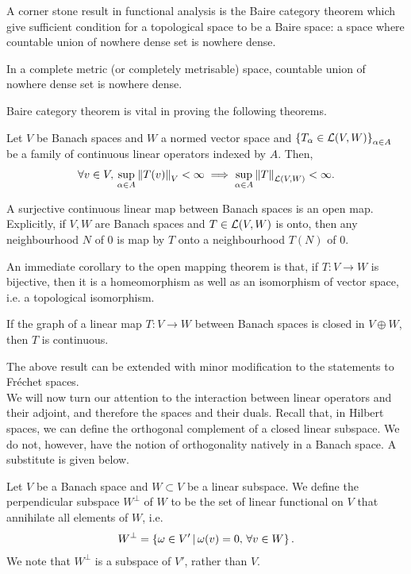 \documentclass[12pt]{article}
\begin{document}
A corner stone result in functional analysis is the Baire category theorem which give sufficient condition for a topological space to be a Baire space: a space where countable union of nowhere dense set is nowhere dense. 
\begin{ftheorem} In a complete metric (or completely metrisable) space, countable union of nowhere dense set is nowhere dense. 
\end{ftheorem}

Baire category theorem is vital in proving the following theorems. 
\begin{ftheorem} Let $V$ be Banach spaces and $W$ a normed vector space and $\set{T_\alpha \in \L(V, W)}_{\alpha \in A}$ be a family of continuous linear operators indexed by $A$. Then, 
\begin{align*}
\forall v \in V, \, \sup_{\alpha \in A} \norm[T(v)]_V < \infty \implies \sup_{\alpha \in A} \norm[T]_{\L(V, W)} < \infty. 
\end{align*}
\end{ftheorem}

\begin{ftheorem} A surjective continuous linear map between Banach spaces is an open map. Explicitly, if $V, W$ are Banach spaces and $T \in \L(V, W)$ is onto, then any neighbourhood $N$ of $0$ is map by $T$ onto a neighbourhood $T(N)$ of $0$. 
\end{ftheorem}
An immediate corollary to the open mapping theorem is that, if $T: V \to W$ is bijective, then it is a homeomorphism as well as an isomorphism of vector space, i.e. a topological isomorphism. 

\begin{ftheorem} If the graph of a linear map $T: V \to W$ between Banach spaces is closed in $V \oplus W$, then $T$ is continuous. 
\end{ftheorem}
The above result can be extended with minor modification to the statements to Fr\'echet spaces. \\

We will now turn our attention to the interaction between linear operators and their adjoint, and therefore the spaces and their duals. Recall that, in Hilbert spaces, we can define the orthogonal complement of a closed linear subspace. We do not, however, have the notion of orthogonality natively in a Banach space. A substitute is given below. 
\begin{fdefinition} Let $V$ be a Banach space and $W \subset V$ be a linear subspace. We define the perpendicular subspace $W^\perp$ of $W$ to be the set of linear functional on $V$ that annihilate all elements of $W$, i.e. 
\begin{align*}
W^\perp = \set{ \omega \in V' \wh \omega(v) = 0, \, \forall v \in W}.
\end{align*}
We note that $W^\perp$ is a subspace of $V'$, rather than $V$. 
\end{fdefinition}
\end{document}
